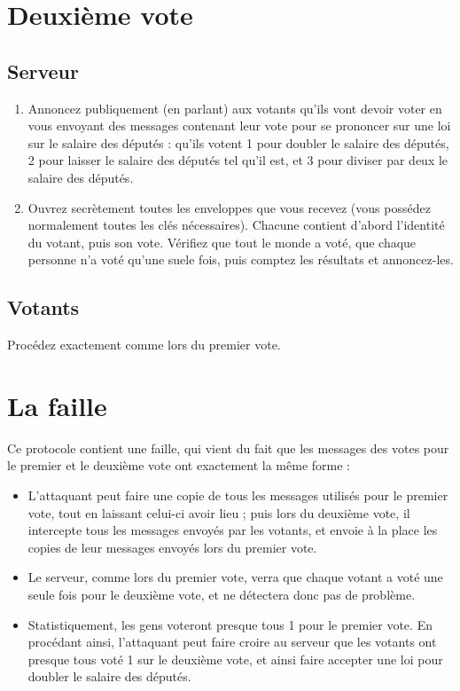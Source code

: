 \documentclass[a4paper,10pt]{article}
\begin{document}
\section{Deuxième vote}
\subsection{Serveur}
	\begin{enumerate}
		\item Annoncez publiquement (en parlant) aux votants qu'ils vont devoir voter en vous envoyant des messages contenant leur vote pour se prononcer sur une loi sur le salaire des députés : qu'ils votent 1 pour doubler le salaire des députés, 2 pour laisser le salaire des députés tel qu'il est, et 3 pour diviser par deux le salaire des députés.
		\item Ouvrez secrètement toutes les enveloppes que vous recevez (vous possédez normalement toutes les clés nécessaires). Chacune contient d'abord l'identité du votant, puis son vote. Vérifiez que tout le monde a voté, que chaque personne n'a voté qu'une suele fois, puis comptez les résultats et annoncez-les.
	\end{enumerate}
\subsection{Votants}
	Procédez exactement comme lors du premier vote.

\section{La faille}
Ce protocole contient une faille, qui vient du fait que les messages des votes pour le premier et le deuxième vote ont exactement la même forme :
\begin{itemize}
	\item L'attaquant peut faire une copie de tous les messages utilisés pour le premier vote, tout en laissant celui-ci avoir lieu ; puis lors du deuxième vote, il intercepte tous les messages envoyés par les votants, et envoie à la place les copies de leur messages envoyés lors du premier vote.
	\item Le serveur, comme lors du premier vote, verra que chaque votant a voté une seule fois pour le deuxième vote, et ne détectera donc pas de problème.
	\item Statistiquement, les gens voteront presque tous 1 pour le premier vote. En procédant ainsi, l'attaquant peut faire croire au serveur que les votants ont presque tous voté 1 sur le deuxième vote, et ainsi faire accepter une loi pour doubler le salaire des députés.
\end{itemize}
\end{document}
